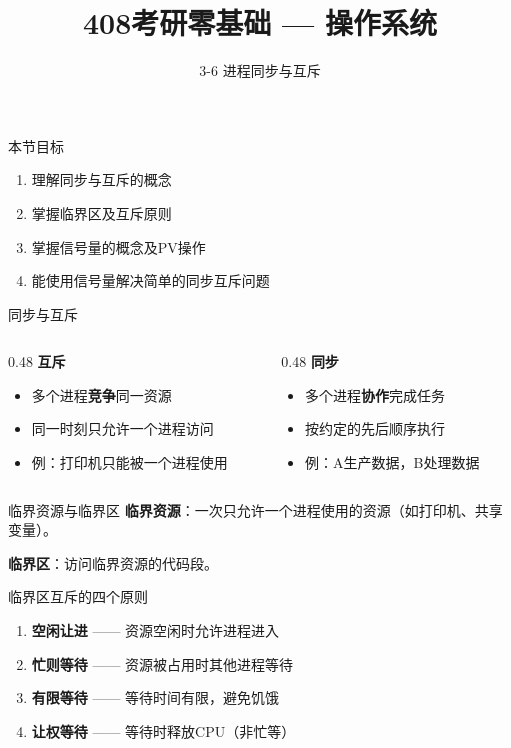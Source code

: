 \documentclass[10pt, aspectratio=169]{beamer}
\title{408考研零基础 --- 操作系统}
\subtitle{3-6 进程同步与互斥}
\author{}
\date{}
\begin{document}
\begin{frame}{本节目标}
    \begin{enumerate}
        \item 理解同步与互斥的概念
        \item 掌握临界区及互斥原则
        \item 掌握信号量的概念及PV操作
        \item 能使用信号量解决简单的同步互斥问题
    \end{enumerate}
\end{frame}

\begin{frame}{同步与互斥}
    \begin{columns}
        \begin{column}{0.48\textwidth}
            \textbf{互斥}
            \begin{itemize}
                \item 多个进程\textbf{竞争}同一资源
                \item 同一时刻只允许一个进程访问
                \item 例：打印机只能被一个进程使用
            \end{itemize}
        \end{column}
        \begin{column}{0.48\textwidth}
            \textbf{同步}
            \begin{itemize}
                \item 多个进程\textbf{协作}完成任务
                \item 按约定的先后顺序执行
                \item 例：A生产数据，B处理数据
            \end{itemize}
        \end{column}
    \end{columns}
\end{frame}

\begin{frame}{临界资源与临界区}
    \textbf{临界资源}：一次只允许一个进程使用的资源（如打印机、共享变量）。

    \textbf{临界区}：访问临界资源的代码段。

    \vspace{0.5em}
    \begin{block}{临界区互斥的四个原则}
        \begin{enumerate}
            \item \textbf{空闲让进} —— 资源空闲时允许进程进入
            \item \textbf{忙则等待} —— 资源被占用时其他进程等待
            \item \textbf{有限等待} —— 等待时间有限，避免饥饿
            \item \textbf{让权等待} —— 等待时释放CPU（非忙等）
        \end{enumerate}
    \end{block}
\end{frame}
\end{document}
